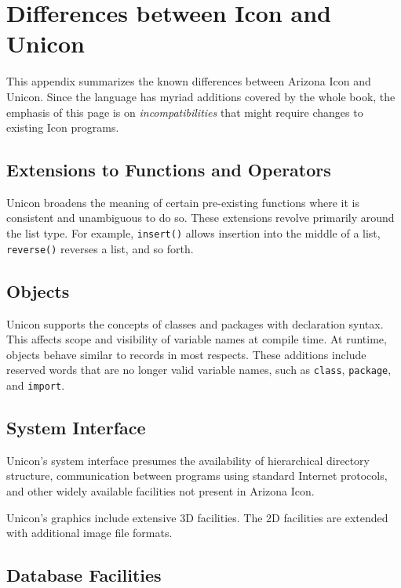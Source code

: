 \chapter{Differences between Icon and Unicon}

\label{Unicon-Icon}
This appendix summarizes the known differences between Arizona Icon and
Unicon. Since the language has myriad additions covered by the whole book,
the emphasis of this page is on {\em incompatibilities\/} that might
require changes to existing Icon programs.

\section{Extensions to Functions and Operators}

Unicon broadens the meaning of certain pre-existing functions where it
is consistent and unambiguous to do so. These extensions revolve
primarily around the list type. For example,
\texttt{insert()} allows insertion into the middle of a
list, \texttt{reverse()} reverses a list, and so forth.

\section{Objects}

Unicon supports the concepts of classes and packages with declaration
syntax. This affects scope and visibility of variable names at compile
time. At runtime, objects behave similar to records in most respects.
These additions include reserved words that are no longer valid variable
names, such as \texttt{class}, \texttt{package}, and \texttt{import}.

\section{System Interface}

Unicon's system interface presumes the availability of
hierarchical directory structure, communication between programs using
standard Internet protocols, and other widely available facilities not
present in Arizona Icon.

Unicon's graphics include extensive 3D facilities.  The 2D facilities
are extended with additional image file formats.

\section{Database Facilities}

